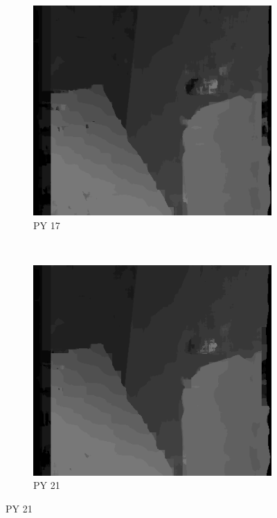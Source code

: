 \begin{figure}
\begin{subfigure}[b]{0.23\textwidth}
  \end{subfigure}
  ~
  \begin{subfigure}[b]{0.23\textwidth}
    \centering
    \includegraphics[width=\textwidth]{images/stereo-pairs/venus_pyramid_17.png}
    \caption{PY 17}
  \end{subfigure}
  ~
  \begin{subfigure}[b]{0.23\textwidth}
    \centering
    \includegraphics[width=\textwidth]{images/stereo-pairs/venus_pyramid_21.png}
    \caption{PY 21}
  \end{subfigure}


\end{figure}
